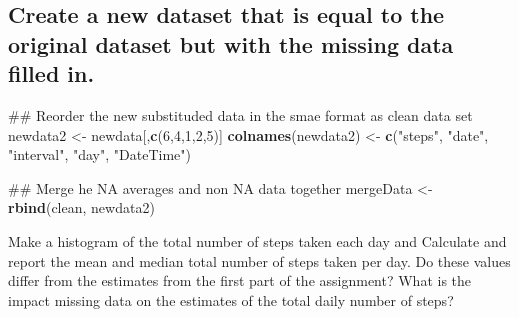 \documentclass[]{article}
\newenvironment{Shaded}{\begin{snugshade}}{\end{snugshade}}
\newcommand{\KeywordTok}[1]{\textcolor[rgb]{0.13,0.29,0.53}{\textbf{#1}}}
\newcommand{\DataTypeTok}[1]{\textcolor[rgb]{0.13,0.29,0.53}{#1}}
\newcommand{\DecValTok}[1]{\textcolor[rgb]{0.00,0.00,0.81}{#1}}
\newcommand{\StringTok}[1]{\textcolor[rgb]{0.31,0.60,0.02}{#1}}
\newcommand{\OperatorTok}[1]{\textcolor[rgb]{0.81,0.36,0.00}{\textbf{#1}}}
\newcommand{\NormalTok}[1]{#1}
\begin{document}
\subsection{Create a new dataset that is equal to the original dataset
but with the missing data filled
in.}\label{create-a-new-dataset-that-is-equal-to-the-original-dataset-but-with-the-missing-data-filled-in.}

\begin{Shaded}
\begin{Highlighting}[]
\NormalTok{## Reorder the new substituded data in the smae format as clean data set}
\NormalTok{newdata2 <-}\StringTok{ }\NormalTok{newdata[,}\KeywordTok{c}\NormalTok{(}\DecValTok{6}\NormalTok{,}\DecValTok{4}\NormalTok{,}\DecValTok{1}\NormalTok{,}\DecValTok{2}\NormalTok{,}\DecValTok{5}\NormalTok{)]}
\KeywordTok{colnames}\NormalTok{(newdata2) <-}\StringTok{ }\KeywordTok{c}\NormalTok{(}\StringTok{"steps"}\NormalTok{, }\StringTok{"date"}\NormalTok{, }\StringTok{"interval"}\NormalTok{, }\StringTok{"day"}\NormalTok{, }\StringTok{"DateTime"}\NormalTok{)}

\NormalTok{## Merge he NA averages and non NA data together}
\NormalTok{mergeData <-}\StringTok{ }\KeywordTok{rbind}\NormalTok{(clean, newdata2)}
\end{Highlighting}
\end{Shaded}

Make a histogram of the total number of steps taken each day and
Calculate and report the mean and median total number of steps taken per
day. Do these values differ from the estimates from the first part of
the assignment? What is the impact missing data on the estimates of the
total daily number of steps?

\begin{Shaded}
\end{Shaded}
\end{document}
